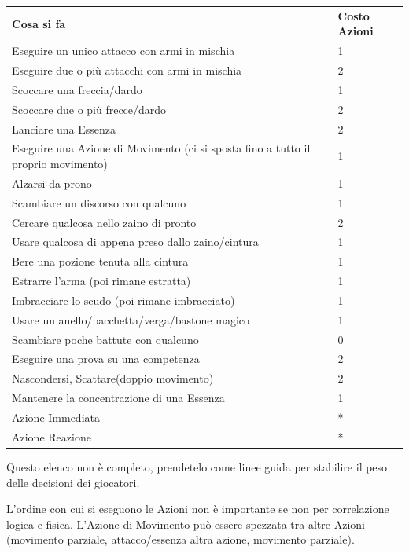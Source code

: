 \documentclass[a4paper,11pt,twoside,openany]{book}
\begin{document}
\begin{tabular}{ll}
	\toprule
	\textbf{Cosa si fa}                                & \textbf{Costo Azioni}\\
	Eseguire un unico attacco con armi in mischia      & 1\\
	Eseguire due o più attacchi con armi in mischia    & 2\\
	Scoccare una freccia/dardo                         & 1\\
	Scoccare due o più frecce/dardo                    & 2\\
	Lanciare una Essenza                               & 2\\
	Eseguire una Azione di Movimento (ci si sposta fino a tutto
	il proprio movimento)                              & 1\\
	Alzarsi da prono                                   & 1 \\
	Scambiare un discorso con qualcuno                 & 1\\
	Cercare qualcosa nello zaino di pronto             & 2\\
	Usare qualcosa di appena preso dallo zaino/cintura & 1\\
	Bere una pozione tenuta alla cintura               & 1\\
	Estrarre l'arma (poi rimane estratta)              & 1\\
	Imbracciare lo scudo (poi rimane imbracciato)      & 1\\
	Usare un anello/bacchetta/verga/bastone magico     & 1\\
	Scambiare poche battute con qualcuno               & 0\\
	Eseguire una prova su una competenza               & 2\\
	Nascondersi, Scattare(doppio movimento)			   & 2\\
	Mantenere la concentrazione di una Essenza         & 1\\
	Azione Immediata                                   & {*}\\
	Azione Reazione                                    & {*}\\
\end{tabular}

\smallskip

Questo elenco non è completo, prendetelo come linee guida per stabilire il peso delle decisioni dei giocatori.

\bigskip

L'ordine con cui si eseguono le Azioni non è importante se non per correlazione logica e fisica. L'Azione di Movimento può essere spezzata tra altre Azioni (movimento parziale, attacco/essenza altra azione, movimento parziale).
\end{document}
